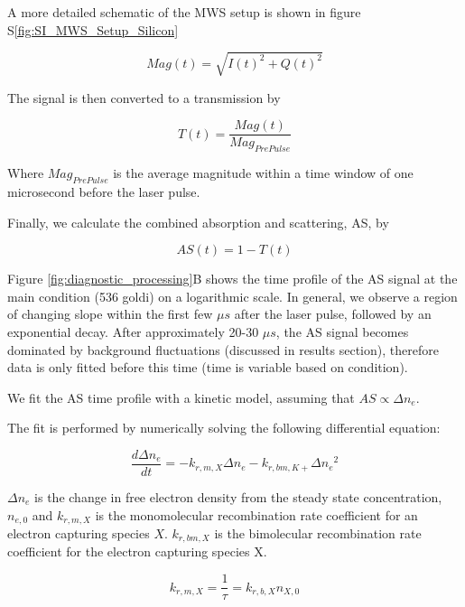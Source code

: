 A more detailed schematic of the MWS setup is shown in figure S\ref*{fig:SI_MWS_Setup_Silicon}

\begin{equation}
    Mag(t) = \sqrt{I(t)^2 + Q(t)^2}
\end{equation}

The signal is then converted to a transmission by 

\begin{equation}
    T(t) = \frac{Mag(t)}{Mag_{Pre Pulse}}
\end{equation}

Where $Mag_{Pre Pulse}$ is the average magnitude within a time window of one microsecond before the laser pulse. 

Finally, we calculate the combined absorption and scattering, AS, by

\begin{equation}
    AS(t) = 1 - T(t)
\end{equation}

Figure \ref{fig:diagnostic_processing}B shows the time profile of the AS signal at the main condition (536 goldi) on a logarithmic scale. In general, we observe a region of changing slope within the first few $\mu s$ after the laser pulse, followed by an exponential decay. After approximately 20-30 $\mu s$, the AS signal becomes dominated by background fluctuations (discussed in results section), therefore data is only fitted before this time (time is variable based on condition). 

We fit the AS time profile with a kinetic model, assuming that $AS \propto \Delta n_e$. 


The fit is performed by numerically solving the following differential equation: 

\begin{equation}
    \frac{d\Delta n_e}{dt} = - k_{r, m, X} \Delta n_e - k_{r, bm, K+}\Delta{n_e}^2
\end{equation}

$\Delta n_e$ is the change in free electron density from the steady state concentration, $n_{e,0}$ and $k_{r, m, X}$ is the monomolecular recombination rate coefficient for an electron capturing species $X$. $k_{r, bm, X}$ is the bimolecular recombination rate coefficient for the electron capturing species X. 

\begin{equation}
    k_{r, m, X} = \frac{1}{\tau} = k_{r, b, X}n_{X,0}
\end{equation}

